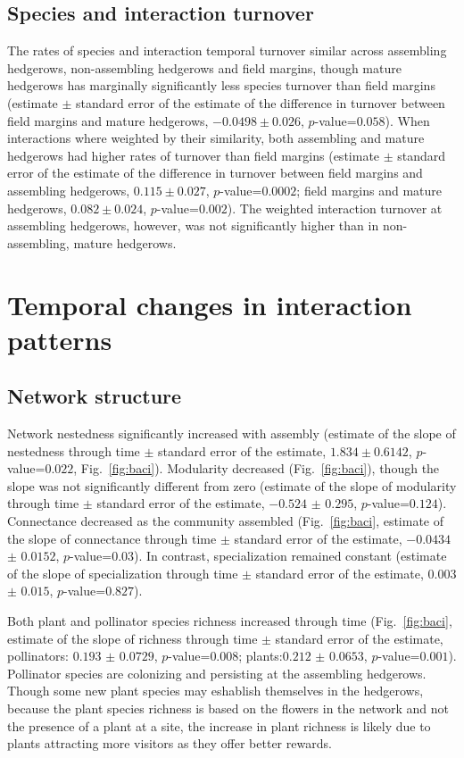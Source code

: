 \documentclass[12pt]{article}
\begin{document}
\subsection*{Species and interaction turnover}
The rates of species and interaction temporal turnover similar across
assembling hedgerows, non-assembling hedgerows and field margins,
though mature hedgerows has marginally significantly less species
turnover than field margins (estimate $\pm$ standard error of the
estimate of the difference in turnover between field margins and
mature hedgerows, $-0.0498 \pm 0.026$, $p$-value=$0.058$). When
interactions where weighted by their similarity, both assembling and
mature hedgerows had higher rates of turnover than field margins
(estimate $\pm$ standard error of the estimate of the difference in
turnover between field margins and assembling hedgerows, $0.115 \pm
0.027$, $p$-value=$0.0002$; field margins and mature hedgerows, $0.082
\pm 0.024$, $p$-value=$0.002$). The weighted interaction turnover at
assembling hedgerows, however, was not significantly higher than in
non-assembling, mature hedgerows.


\section*{Temporal changes in interaction patterns}
\subsection*{Network structure}
Network nestedness significantly increased with assembly (estimate of
the slope of nestedness through time $\pm$ standard error of the
estimate, $1.834 \pm 0.6142$, $p$-value=$0.022$, Fig.~\ref{fig:baci}).
Modularity decreased (Fig.~\ref{fig:baci}), though the slope was not
significantly different from zero (estimate of the slope of modularity
through time $\pm$ standard error of the estimate, $-0.524$ $\pm$
$0.295$, $p$-value=$0.124$). Connectance decreased as the community
assembled (Fig.~\ref{fig:baci}, estimate of the slope of connectance
through time $\pm$ standard error of the estimate, $-0.0434$ $\pm$
$0.0152$, $p$-value=$0.03$). In contrast, specialization remained
constant (estimate of the slope of specialization through time $\pm$
standard error of the estimate, $0.003$ $\pm$ $0.015$,
$p$-value=$0.827$).

Both plant and pollinator species richness increased through time
(Fig.~\ref{fig:baci}, estimate of the slope of richness through time
$\pm$ standard error of the estimate, pollinators: $0.193$ $\pm$
$0.0729$, $p$-value=$0.008$; plants:$0.212$ $\pm$ $0.0653$,
$p$-value=$0.001$). Pollinator species are colonizing and persisting
at the assembling hedgerows. Though some new plant species may
eshablish themselves in the hedgerows, because the plant species
richness is based on the flowers in the network and not the presence
of a plant at a site, the increase in plant richness is likely due to
plants attracting more visitors as they offer better rewards.
\end{document}

